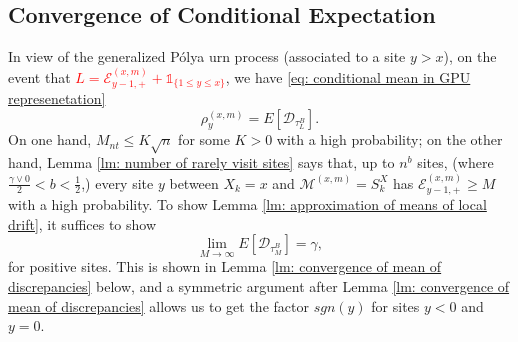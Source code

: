 \documentclass[twoside,12pt,a4paper]{article}
\numberwithin{equation}{section}
\newcommand{\edt}[1]{\textcolor{red}{#1}} %
\newcommand{\comment}[1]{\textcolor{blue}{#1}}
\begin{document}
	\subsection{Convergence of Conditional Expectation}
	\label{sec:RhoGamma}
	In view of the generalized P\'{o}lya urn process (associated to a site $y> x$), 
	on the event that \edt{$ L = \mathcal{E}^{(x,m)}_{y-1,+} +\mathbb{1}_{\{1\leq y\leq x\}}$}, we have \eqref{eq: conditional mean in GPU represenetation} 
	$$\rho^{(x,m)}_y = E[\mathcal{D}_{\tau_L^B}].$$ 
	On one hand, $M_{nt} \leq K\sqrt{n} $ for some $K>0$ with a high probability; on the other hand, Lemma \ref{lm: number of rarely visit sites} says that, up to $n^b$ sites, (where $\frac{\gamma \vee 0}{2}<b<\frac{1}{2}$,) every site $y$ between $X_k=x$ and $\mathcal{M}^{(x,m)} =S_{k}^X$ has $ \mathcal{E}^{(x,m)}_{y-1,+} \geq M  $ with a high probability. To show Lemma \ref{lm: approximation of means of local drift}, it suffices to show 
	\begin{equation}\label{eq: convergence of conditional expectation}
		\lim_{M\to\infty} E[\mathcal{D}_{\tau_M^B}] = \gamma , 
	\end{equation} for positive sites. This is shown in Lemma \ref{lm: convergence of mean of discrepancies} below, and a symmetric argument after Lemma \ref{lm: convergence of mean of discrepancies} allows us to get the factor $sgn(y)$ for sites $y<0$ and $y=0$.
	
\end{document}

